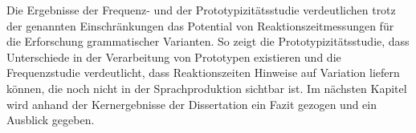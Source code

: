 \begin{sloppypar}
Die Ergebnisse der Frequenz- und der Prototypizitätsstudie verdeutlichen trotz der genannten Einschränkungen das Potential von Reaktionszeitmessungen für die Erforschung grammatischer Varianten. So zeigt die Prototypizitätsstudie, dass Unterschiede in der Verarbeitung von Prototypen existieren und die Frequenzstudie verdeutlicht, dass Reaktionszeiten Hinweise auf Variation liefern können, die noch nicht in der Sprachproduktion sichtbar ist. Im nächsten Kapitel wird anhand der Kernergebnisse der Dissertation ein Fazit gezogen und ein Ausblick gegeben.
\end{sloppypar}
